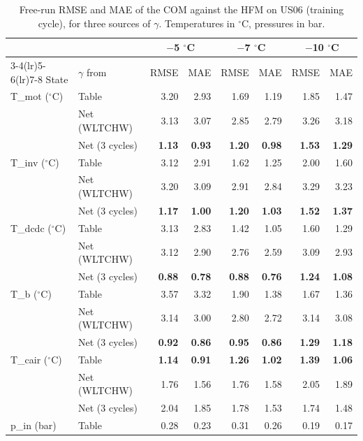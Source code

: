 \begin{table}[t]
\centering
\caption{Free-run RMSE and MAE of the COM against the HFM on US06 (training cycle), for three sources of $\gamma$. Temperatures in $^\circ$C, pressures in bar.}
\label{tab:freerun_us06}
\small
\begin{tabular}{llrrrrrr}
\toprule
 & & \multicolumn{2}{c}{$-$5 $^\circ$C} & \multicolumn{2}{c}{$-$7 $^\circ$C} & \multicolumn{2}{c}{$-$10 $^\circ$C} \\
\cmidrule(lr){3-4}\cmidrule(lr){5-6}\cmidrule(lr){7-8}
State & $\gamma$ from & RMSE & MAE & RMSE & MAE & RMSE & MAE \\
\midrule
T\_mot ($^\circ$C) & Table & 3.20 & 2.93 & 1.69 & 1.19 & 1.85 & 1.47 \\
 & Net (WLTCHW) & 3.13 & 3.07 & 2.85 & 2.79 & 3.26 & 3.18 \\
 & Net (3 cycles) & \textbf{1.13} & \textbf{0.93} & \textbf{1.20} & \textbf{0.98} & \textbf{1.53} & \textbf{1.29} \\
\addlinespace
T\_inv ($^\circ$C) & Table & 3.12 & 2.91 & 1.62 & 1.25 & 2.00 & 1.60 \\
 & Net (WLTCHW) & 3.20 & 3.09 & 2.91 & 2.84 & 3.29 & 3.23 \\
 & Net (3 cycles) & \textbf{1.17} & \textbf{1.00} & \textbf{1.20} & \textbf{1.03} & \textbf{1.52} & \textbf{1.37} \\
\addlinespace
T\_dcdc ($^\circ$C) & Table & 3.13 & 2.83 & 1.42 & 1.05 & 1.60 & 1.29 \\
 & Net (WLTCHW) & 3.12 & 2.90 & 2.76 & 2.59 & 3.09 & 2.93 \\
 & Net (3 cycles) & \textbf{0.88} & \textbf{0.78} & \textbf{0.88} & \textbf{0.76} & \textbf{1.24} & \textbf{1.08} \\
\addlinespace
T\_b ($^\circ$C) & Table & 3.57 & 3.32 & 1.90 & 1.38 & 1.67 & 1.36 \\
 & Net (WLTCHW) & 3.14 & 3.00 & 2.80 & 2.72 & 3.14 & 3.08 \\
 & Net (3 cycles) & \textbf{0.92} & \textbf{0.86} & \textbf{0.95} & \textbf{0.86} & \textbf{1.29} & \textbf{1.18} \\
\addlinespace
T\_cair ($^\circ$C) & Table & \textbf{1.14} & \textbf{0.91} & \textbf{1.26} & \textbf{1.02} & \textbf{1.39} & \textbf{1.06} \\
 & Net (WLTCHW) & 1.76 & 1.56 & 1.76 & 1.58 & 2.05 & 1.89 \\
 & Net (3 cycles) & 2.04 & 1.85 & 1.78 & 1.53 & 1.74 & 1.48 \\
\addlinespace
p\_in (bar) & Table & 0.28 & 0.23 & 0.31 & 0.26 & 0.19 & 0.17 \\

\end{tabular}
\end{table}
